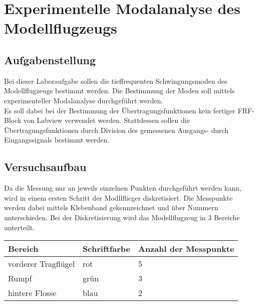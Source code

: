 \chapter{Experimentelle Modalanalyse des Modellflugzeugs}
\label{sec: Hauptkapitel 1}

\section{Aufgabenstellung}
    Bei dieser Laboraufgabe sollen die tieffrequenten Schwingungsmoden des
    Modellflugzeugs bestimmt werden. Die Bestimmung der Moden soll mittels
    experimenteller Modalanalyse durchgeführt werden.
    \\

    \noindent
    Es soll dabei bei der Bestimmung der Übertragungsfunktionen kein fertiger
    FRF-Block von Labview verwendet werden. Stattdessen sollen die
    Übertragungsfunktionen durch Division des gemessenen Ausgangs- durch
    Eingangssignals bestimmt werden.

\section{Versuchsaufbau}
    Da die Messung nur an jeweils einzelnen Punkten durchgeführt werden kann,
    wird in einem ersten Schritt der Modllflieger diskretisiert. Die Messpunkte
    werden dabei mittels Klebenband gekennzeichnet und über Nummern
    unterschieden. Bei der Diskretisierung wird das Modellflugzeug in 3 Bereiche
    unterteilt.

    \begin{table}[h]
        \centering
        \begin{tabular}{|p{3.5cm}|p{3cm}|p{5cm}|}
            \hline
            \textbf{Bereich} &   \textbf{Schriftfarbe}    &   \textbf{Anzahl der Messpunkte}   \\
            \hline \hline
            vorderer Tragflügel &   rot &   5   \\
            \hline
            Rumpf   &   grün    &   3   \\
            \hline
            hintere Flosse  &   blau    &   2   \\
            \hline
        \end{tabular}
        \label{tab: Fliegerdiskretisierung}
    \end{table}

